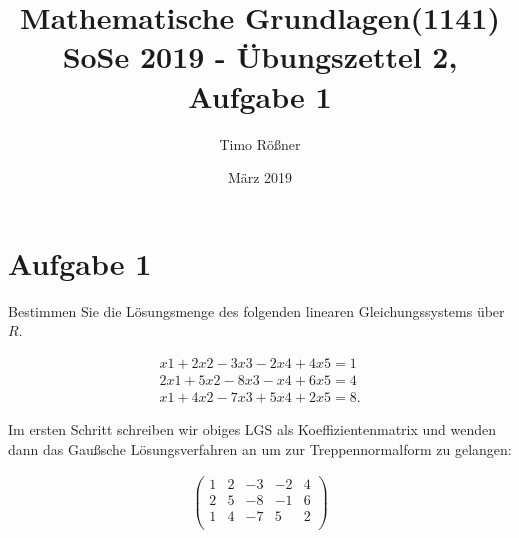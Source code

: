 \documentclass{article}
\title{Mathematische Grundlagen(1141) SoSe 2019 - Übungszettel 2, Aufgabe 1}
\author{Timo Rößner }
\date{März 2019}
\begin{document}
\maketitle

\section*{Aufgabe 1}

Bestimmen Sie die Lösungsmenge des folgenden linearen Gleichungssystems über \(R\).

\[
\begin{split}
x1 + 2x2 − 3x3 − 2x4 + 4x5 = 1 \\
2x1 + 5x2 − 8x3 − x4 + 6x5 = 4 \\
x1 + 4x2 − 7x3 + 5x4 + 2x5 = 8.
\end{split}
\]

Im ersten Schritt schreiben wir obiges LGS als Koeffizientenmatrix und wenden dann das Gaußsche Lösungsverfahren an um zur Treppennormalform zu gelangen:

\[
\begin{split}
\begin{pmatrix}
  1 & 2 & -3 & -2 & 4 \\
  2 & 5 & -8 & -1 & 6 \\
  1 & 4 & -7 & 5 & 2 \\
\end{pmatrix}
\end{split}
\]
\end{document}
